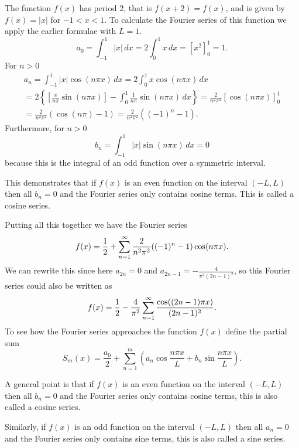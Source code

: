 \documentclass[10pt, a4paper]{article}
\begin{document}
\begin{example}
    The function $f(x)$ has period $2$,
    that is $f(x + 2) = f(x)$,
    and is given by $f(x) = |x|$ for $-1 < x < 1$.
    To calculate the Fourier series of this function we apply the earlier formulae with $L = 1$.
    \[
    a_0 = \int_{-1}^{1}|x|\,dx = 2\int_{0}^{1}x\,dx = \left[x ^ 2\right]_{0}^{1} = 1.
    \]
    For $n > 0$
    \begin{gather*}
        a_n = \int_{-1}^{1}|x|\cos(n\pi x)\,dx = 2\int_{0}^{1}x\cos(n\pi x)\,dx \\
        = 2\left\{\left[\frac{x}{n\pi}\sin(n\pi x)\right] - \int_{0}^{1}\frac{1}{n\pi}\sin(n\pi x)\,dx\right\} = \frac{2}{n ^ 2\pi ^ 2}\left[\cos(n\pi x)\right]_{0}^{1} \\
        = \frac{2}{n ^ 2\pi ^ 2}(\cos(n\pi) - 1) = \frac{2}{n ^ 2\pi ^ 2}((-1) ^ n - 1).
    \end{gather*}
    Furthermore,
    for $n > 0$
    \[
    b_n = \int_{-1}^{1}|x|\sin(n\pi x)\,dx = 0
    \]
    because this is the integral of an odd function over a symmetric interval.

    This demonstrates that if $f(x)$ is an even function on the interval $(-L, L)$ then all $b_n = 0$ and the Fourier series only contains cosine terms.
    This is called a cosine series.

    Putting all this together we have the Fourier series
    \[
    f(x) = \frac{1}{2} + \infsum[n = 1]\frac{2}{n ^ 2\pi ^ 2}((-1) ^ n - 1)\cos(n\pi x).
    \]
    We can rewrite this since here $a_{2n} = 0$ and $a_{2n - 1} = -\frac{4}{\pi ^ 2(2n - 1) ^ 2}$,
    so this Fourier series could also be written as
    \[
    f(x) = \frac{1}{2} - \frac{4}{\pi ^ 2}\infsum[n = 1]\frac{\cos((2n - 1)\pi x)}{(2n - 1) ^ 2}.
    \]
    To see how the Fourier series approaches the function $f(x)$ define the partial sum
    \[
    S_m(x) = \frac{a_0}{2} + \sum_{n = 1}^{m}\left(a_n\cos{\frac{n\pi x}{L}} + b_n\sin{\frac{n\pi x}{L}}\right).
    \]
\end{example}

\begin{remark}
    A general point is that if $f(x)$ is an even function on the interval $(-L, L)$ then all $b_n = 0$ and the Fourier series only contains cosine terms,
    this is also called a cosine series.

    Similarly,
    if $f(x)$ is an odd function on the interval $(-L, L)$ then all $a_n = 0$ and the Fourier series only contains sine terms,
    this is also called a sine series.
\end{remark}
\end{document}
